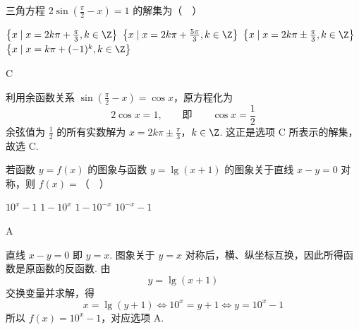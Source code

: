 \begin{problem}
三角方程 \(2\sin \left(\frac{\pi}{2} - x\right) = 1\) 的解集为（\(\quad\)）

\choices
    {\(\left\{x\mid x = 2k\pi +\frac{\pi}{3},k\in \Z\right\}\)}
    {\(\left\{x\mid x = 2k\pi +\frac{5\pi}{3},k\in \Z\right\}\)}
    {\(\left\{x\mid x = 2k\pi \pm \frac{\pi}{3},k\in \Z\right\}\)}
    {\(\left\{x\mid x = k\pi +(-1)^k,k\in \Z\right\}\)}
\end{problem}

\begin{answer}
C
\end{answer}

\begin{solution}
利用余函数关系 \(\sin\left(\frac{\pi}{2}-x\right)=\cos x\)，原方程化为
\[
2\cos x=1,\qquad\text{即}\qquad \cos x=\frac{1}{2}
\]
余弦值为 \(\frac12\) 的所有实数解为
\(x=2k\pi\pm\frac{\pi}{3}\)，\(k\in\Z\).
这正是选项 C 所表示的解集，故选 C.
\end{solution}

\begin{problem}
若函数 \(y = f(x)\) 的图象与函数 \(y = \lg\left(x + 1\right)\) 的图象关于直线 \(x - y = 0\) 对称，则 \(f(x) =\)（\(\quad\)）

\choices
    {\(10^{x} - 1\)}
    {\(1 - 10^{x}\)}
    {\(1 - 10^{-x}\)}
    {\(10^{-x} - 1\)}
\end{problem}

\begin{answer}
A
\end{answer}

\begin{solution}
直线 \(x-y=0\) 即 \(y=x\). 图象关于 \(y=x\) 对称后，横、纵坐标互换，因此所得函数是原函数的反函数. 由
\[
y=\lg(x+1)
\]
交换变量并求解，得
\[
x=\lg(y+1)
\Longleftrightarrow 10^x=y+1
\Longleftrightarrow y=10^x-1
\]
所以 \(f(x)=10^x-1\)，对应选项 A.
\end{solution}

